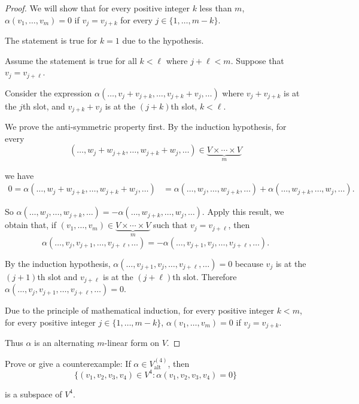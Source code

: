 \begin{proof}
    We will show that for every positive integer $k$ less than $m$, $\alpha(v_{1}, \ldots, v_{m}) = 0$ if $v_{j} = v_{j+k}$ for every $j\in\{1,\ldots,m-k\}$.

    The statement is true for $k = 1$ due to the hypothesis.

    Assume the statement is true for all $k < \ell$ where $j + \ell < m$. Suppose that $v_{j} = v_{j + \ell}$.

    Consider the expression $\alpha(\ldots, v_{j} + v_{j+k}, \ldots, v_{j+k} + v_{j}, \ldots)$ where $v_{j} + v_{j+k}$ is at the $j$th slot, and $v_{j+k} + v_{j}$ is at the ${(j+k)}$th slot, $k < \ell$.

    We prove the anti-symmetric property first. By the induction hypothesis, for every
    \[
        (\ldots, w_{j} + w_{j+k}, \ldots, w_{j+k} + w_{j}, \ldots)\in \underbrace{V\times\cdots\times V}_{m}
    \]

    we have
    \begin{align*}
        0 = \alpha(\ldots, w_{j} + w_{j+k}, \ldots, w_{j+k} + w_{j}, \ldots) & = \alpha(\ldots, w_{j}, \ldots, w_{j+k}, \ldots) + \alpha(\ldots, w_{j+k}, \ldots, w_{j}, \ldots).
    \end{align*}

    So $\alpha(\ldots, w_{j}, \ldots, w_{j+k}, \ldots) = -\alpha(\ldots, w_{j+k}, \ldots, w_{j}, \ldots)$. Apply this result, we obtain that, if $(v_{1}, \ldots, v_{m})\in \underbrace{V\times\cdots\times V}_{m}$ such that $v_{j} = v_{j+\ell}$, then
    \[
        \alpha(\ldots, v_{j}, v_{j+1}, \ldots, v_{j+\ell}, \ldots) = -\alpha(\ldots, v_{j+1}, v_{j}, \ldots, v_{j+\ell}, \ldots).
    \]

    By the induction hypothesis, $\alpha(\ldots, v_{j+1}, v_{j}, \ldots, v_{j+\ell}, \ldots) = 0$ because $v_{j}$ is at the $(j+1)$th slot and $v_{j+\ell}$ is at the $(j+\ell)$th slot. Therefore $\alpha(\ldots, v_{j}, v_{j+1}, \ldots, v_{j+\ell}, \ldots) = 0$.

    Due to the principle of mathematical induction, for every positive integer $k < m$, for every positive integer $j\in\{1,\ldots,m-k\}$, $\alpha(v_{1}, \ldots, v_{m}) = 0$ if $v_{j} = v_{j + k}$.

    Thus $\alpha$ is an alternating $m$-linear form on $V$.
\end{proof}
\newpage

\begin{exercise}\label{chapter9:sectionB:exercise4}
    Prove or give a counterexample: If $\alpha\in V^{(4)}_{\text{alt}}$, then
    \[
        \{ (v_{1}, v_{2}, v_{3}, v_{4})\in V^{4}: \alpha(v_{1}, v_{2}, v_{3}, v_{4}) = 0 \}
    \]

    is a subspace of $V^{4}$.
\end{exercise}

